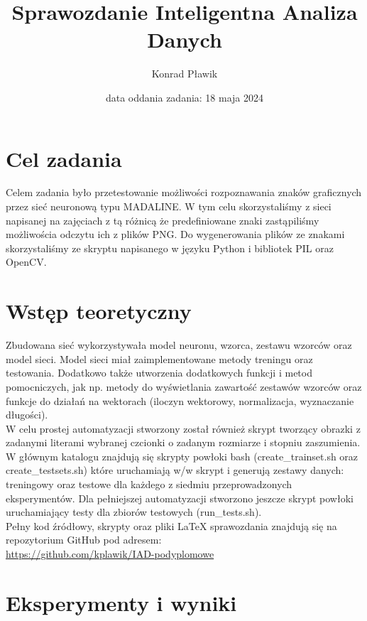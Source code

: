 \documentclass[12pt]{article}
\title{{\bf Sprawozdanie}\linebreak
Inteligentna Analiza Danych}
\author{Konrad Pławik}
\date{data oddania zadania: 18 maja 2024}
\begin{document}
\clearpage\maketitle
\thispagestyle{empty}
\newpage
\setcounter{page}{1}
\section{Cel zadania}

Celem zadania było przetestowanie możliwości rozpoznawania znaków graficznych przez sieć neuronową 
typu MADALINE. W tym celu skorzystaliśmy z sieci napisanej na zajęciach z tą różnicą że predefiniowane znaki zastąpiliśmy możliwościa odczytu ich z plików PNG. Do wygenerowania plików ze znakami skorzystaliśmy ze skryptu napisanego w języku Python i bibliotek PIL oraz OpenCV.\\

\section{Wstęp teoretyczny}

Zbudowana sieć wykorzystywała model neuronu, wzorca, zestawu wzorców oraz model sieci. Model sieci miał zaimplementowane metody treningu oraz testowania. Dodatkowo także utworzenia dodatkowych funkcji i metod pomocniczych, jak np. metody do wyświetlania zawartość zestawów wzorców oraz funkcje do działań na wektorach (iloczyn wektorowy, normalizacja, wyznaczanie długości).\\

\noindent
W celu prostej automatyzacji stworzony został również skrypt tworzący obrazki z zadanymi literami wybranej czcionki o zadanym rozmiarze i stopniu zaszumienia. W głównym katalogu znajdują się skrypty powłoki bash (create\_trainset.sh oraz create\_testsets.sh) które uruchamiają w/w skrypt i generują zestawy danych: treningowy oraz testowe dla każdego z siedmiu przeprowadzonych eksperymentów. Dla pełniejszej automatyzacji stworzono jeszcze skrypt powłoki uruchamiający testy dla zbiorów testowych (run\_tests.sh).\\

\noindent
Pełny kod źródłowy, skrypty oraz pliki LaTeX sprawozdania znajdują się na repozytorium GitHub pod adresem: \\

\url{https://github.com/kplawik/IAD-podyplomowe}

\section{Eksperymenty i wyniki}
\end{document}
